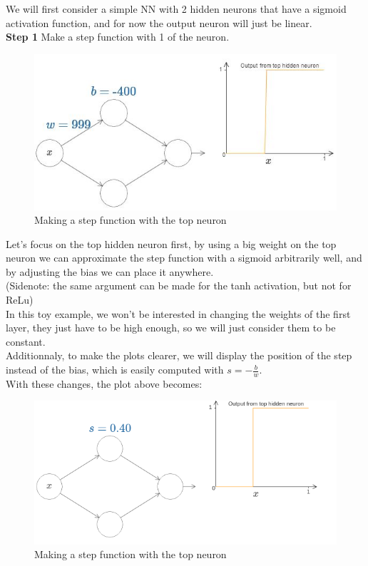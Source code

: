 \documentclass{article}
\begin{document}
We will first consider a simple NN with 2 hidden neurons that have a sigmoid activation function, and for now the output neuron will just be linear. \\

\textbf{Step 1} Make a step function with 1 of the neuron.
\begin{figure}[H]
    \centering
    \includegraphics[width=.6\textwidth]{figures/high_weight_function.jpg}
    \caption{Making a step function with the top neuron}
\end{figure}
Let's focus on the top hidden neuron first, by using a big weight on the top neuron we can approximate the step function with a sigmoid arbitrarily well, and by adjusting the bias we can place it anywhere. \\
(Sidenote: the same argument can be made for the tanh activation, but not for ReLu) \\
In this toy example, we won't be interested in changing the weights of the first layer, they just have to be high enough, so we will just consider them to be constant. \\
Additionnaly, to make the plots clearer, we will display the position of the step instead of the bias, which is easily computed with $s = -\frac{b}{w}$. \\
With these changes, the plot above becomes:
\begin{figure}[H]
    \centering
    \includegraphics[width=.6\textwidth]{figures/2nn_s.png}
    \caption{Making a step function with the top neuron}
\end{figure}
\end{document}
